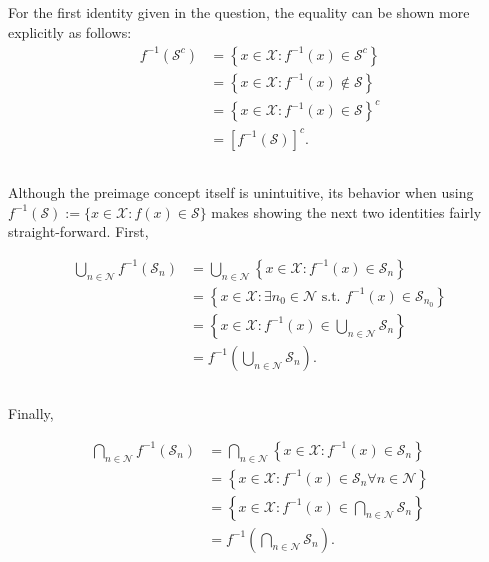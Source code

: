 \documentclass[12 pt,letterpaper]{article}
\newcommand{\calS}{\mathcal{S}}
\newcommand{\calX}{\mathcal{X}}
\newcommand{\set}[1]{\{{#1}\}}
\begin{document}
\subsection{}
For the first identity given in the question, the equality can be shown more explicitly
as follows:
\begin{align*}
    f^{-1}(\mathcal{S}^c)
    &= \left\{x\in\mathcal{X} : f^{-1}(x)\in\mathcal{S}^c\right\} \\
    &= \left\{x\in\mathcal{X}: f^{-1}(x)\notin\mathcal{S}\right\} \\
    &= \left\{x\in\mathcal{X}: f^{-1}(x)\in\mathcal{S}\right\}^c \\
    &= \left[f^{-1}(\mathcal{S})\right]^c.
\end{align*}

\subsection{}
Although the preimage concept itself is unintuitive, its behavior when using 
$f^{-1}(\calS):=\set{x\in\calX: f(x)\in\calS}$
makes showing the next two identities fairly straight-forward.
First,

\begin{align*}
    \bigcup_{n\in\mathcal{N}} f^{-1}\left(\mathcal{S}_n\right)
    &= \bigcup_{n\in\mathcal{N}} \left\{x\in\mathcal{X} : f^{-1}(x)\in\mathcal{S}_n\right\} \\
    &= \left\{x\in\mathcal{X} : \exists n_0\in\mathcal{N} \text{ s.t. }
    f^{-1}(x)\in\mathcal{S}_{n_0}\right\} \\
    &= \left\{x\in\mathcal{X} : f^{-1}(x)\in\bigcup_{n\in\mathcal{N}} \mathcal{S}_n\right\} \\
    &= f^{-1}\left(\bigcup_{n\in\mathcal{N}} \mathcal{S}_n\right).
\end{align*}

\subsection{}
Finally,

\begin{align*}
    \bigcap_{n\in\mathcal{N}} f^{-1}\left(\mathcal{S}_n\right)
    &= \bigcap_{n\in\mathcal{N}} \left\{x\in\mathcal{X} : f^{-1}(x)\in\mathcal{S}_n\right\} \\
    &= \left\{x\in\mathcal{X} : f^{-1}(x)\in\mathcal{S}_n \forall n\in\mathcal{N}\right\} \\
    &= \left\{x\in\mathcal{X} : f^{-1}(x)\in \bigcap_{n\in\mathcal{N}} \mathcal{S}_n \right\} \\
    &= f^{-1}\left(\bigcap_{n\in\mathcal{N}} \mathcal{S}_n\right).
\end{align*}
\end{document}
